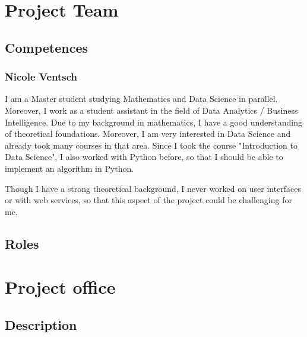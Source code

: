 \documentclass[notitlepage]{article}
\begin{document}
\begin{flushleft}
\section{Project Team}

\subsection{Competences} 
\subsubsection{Nicole Ventsch}

I am a Master student studying Mathematics and Data Science in parallel.  Moreover, I work as a student assistant in the field of Data Analytics / Business Intelligence. Due to my background in mathematics, I have a good understanding of theoretical foundations. Moreover, I am very interested in Data Science and already took many courses in that area. Since I took the course "Introduction to Data Science", I also worked with Python before, so that I should be able to implement an algorithm in Python.

Though I have a strong theoretical background, I never worked on user interfaces or with web services, so that this aspect of the project could be challenging for me. 

\subsection{Roles}

\section{Project office}

\subsection{Description}

\end{flushleft}
\end{document}
